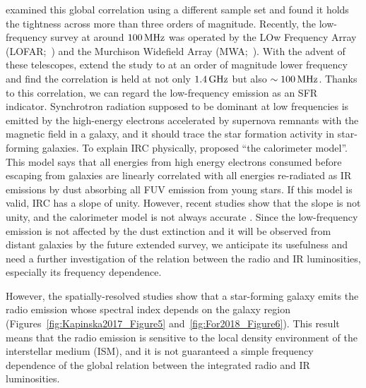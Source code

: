 \citet{Condon1991a,Yun2001a, Bell2003} examined this global correlation using a different sample set and found it holds the tightness across more than three orders of magnitude.
Recently, the low-frequency survey at around $100\,\mathrm{MHz}$ was operated by the LOw Frequency Array (LOFAR;~\citealt{VanHaarlem2013}) and the Murchison Widefield Array (MWA;~\citealt{Tingay2013a}).
With the advent of these telescopes, \citet{CalistroRivera2017a, Read2018, Wang2019} extend the study to at an order of magnitude lower frequency and find the correlation is held at not only $1.4\,\mathrm{GHz}$ but also $\sim 100\,\mathrm{MHz}$.
Thanks to this correlation, we can regard the low-frequency emission as an SFR indicator.
Synchrotron radiation supposed to be dominant at low frequencies is emitted by the high-energy electrons accelerated by supernova remnants with the magnetic field in a galaxy, and it should trace the star formation activity in star-forming galaxies.
To explain IRC physically, \citet{Volk1989} proposed ``the calorimeter model''.
This model says that all energies from high energy electrons consumed before escaping from galaxies are linearly correlated with all energies re-radiated as IR emissions by dust absorbing all FUV emission from young stars.
If this model is valid, IRC has a slope of unity.
However, recent studies show that the slope is not unity, and the calorimeter model is not always accurate \citep{CalistroRivera2017a, Read2018}.
Since the low-frequency emission is not affected by the dust extinction \citep{Yun2001a, Murphy2011} and it will be observed from distant galaxies by the future extended survey, we anticipate its usefulness and need a further investigation of the relation between the radio and IR luminosities, especially its frequency dependence.

However, the spatially-resolved studies show that a star-forming galaxy emits the radio emission whose spectral index depends on the galaxy region \citep{Kapinska2017a, For2018a, Heesen2019} (Figures~\ref{fig:Kapinska2017_Figure5} and~\ref{fig:For2018_Figure6}).
This result means that the radio emission is sensitive to the local density environment of the interstellar medium (ISM), and it is not guaranteed a simple frequency dependence of the global relation between the integrated radio and IR luminosities.

